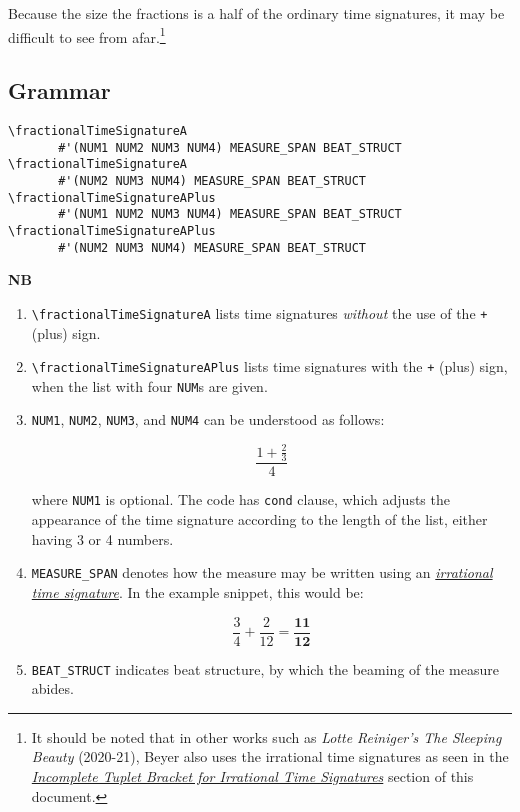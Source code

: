 Because the size the fractions is a half of the ordinary time signatures, it may be difficult to see from afar.\footnote{It should be noted that in other works such as \textit{Lotte Reiniger's The Sleeping Beauty} (2020-21), Beyer also uses the irrational time signatures as seen in the \hyperref[sec:incompleteTuplet]{\textit{Incomplete Tuplet Bracket for Irrational Time Signatures}} section of this document.} 
\label{sec:time_signatures_styleA_convention}

\subsection{Grammar}
\begin{verbatim}
\fractionalTimeSignatureA 
       #'(NUM1 NUM2 NUM3 NUM4) MEASURE_SPAN BEAT_STRUCT
\fractionalTimeSignatureA 
       #'(NUM2 NUM3 NUM4) MEASURE_SPAN BEAT_STRUCT
\fractionalTimeSignatureAPlus 
       #'(NUM1 NUM2 NUM3 NUM4) MEASURE_SPAN BEAT_STRUCT
\fractionalTimeSignatureAPlus 
       #'(NUM2 NUM3 NUM4) MEASURE_SPAN BEAT_STRUCT
\end{verbatim}
\textbf{NB} 
\begin{enumerate}
\item \verb|\fractionalTimeSignatureA| lists time signatures \textit{without} the use of the \verb|+| (plus) sign. 
\item \verb|\fractionalTimeSignatureAPlus| lists time signatures with the \verb|+| (plus) sign, when the list with four \verb|NUM|s are given.
\item \verb|NUM1|, \verb|NUM2|, \verb|NUM3|, and \verb|NUM4| can be understood as follows: \par
\[ \frac{1+\frac{2}{3}}{4} \] \par
where \verb|NUM1| is optional. The code has \verb|cond| clause, which adjusts the appearance of the time signature according to the length of the list, either having 3 or 4 numbers.
\item \verb|MEASURE_SPAN| denotes how the measure may be written using an \hyperref[sec:incompleteTuplet]{\textit{irrational time signature}}. In the example snippet, this would be: \par
\[ \frac{3}{4} + \frac{2}{12} = \mathbf{\frac{11}{12}}\] \par
\item \verb |BEAT_STRUCT| indicates beat structure, by which the beaming of the measure abides.
\end{enumerate}
